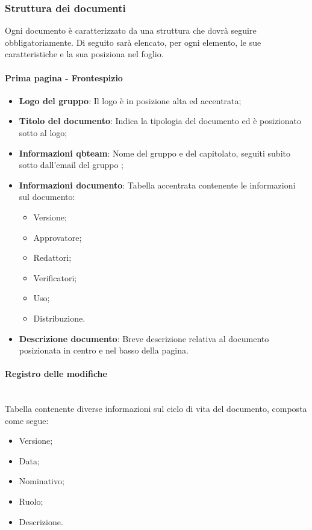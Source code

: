 \subsubsection{Struttura dei documenti}
Ogni documento è caratterizzato da una struttura che dovrà seguire obbligatoriamente.
Di seguito sarà elencato, per ogni elemento, le sue caratteristiche e la sua posiziona nel foglio.

\paragraph{Prima pagina - Frontespizio}\mbox{}
\begin{itemize}
\item \textbf{Logo del gruppo}: Il logo è in posizione alta ed accentrata;
\item \textbf{Titolo del documento}: Indica la tipologia del documento ed è posizionato sotto al logo;
\item \textbf{Informazioni qbteam}: Nome del gruppo \Gruppo e del capitolato, seguiti subito sotto dall'email del gruppo \Gruppo; 
\item \textbf{Informazioni documento}: Tabella accentrata contenente le informazioni sul documento:
\begin{itemize}
\item Versione;
\item Approvatore;
\item Redattori;
\item Verificatori;
\item Uso;
\item Distribuzione.
\end{itemize}
\item \textbf{Descrizione documento}: Breve descrizione relativa al documento posizionata in centro e nel basso della pagina.
\end{itemize}

\paragraph{Registro delle modifiche} \mbox{} \\
Tabella contenente diverse informazioni sul ciclo di vita del documento, composta come segue:
\begin{itemize}
\item Versione;
\item Data;
\item Nominativo;
\item Ruolo;
\item Descrizione.
\end{itemize}

